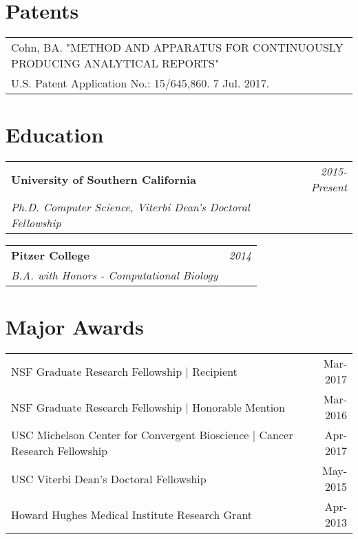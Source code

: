 \documentclass[10pt,a4paper]{article}
\begin{document}
\vspace*{3mm}\section*{Patents}

  \vspace*{1mm}\begin{tabularx}{17cm}{X}
Cohn, BA. "METHOD AND APPARATUS FOR CONTINUOUSLY PRODUCING ANALYTICAL REPORTS"\\
 U.S. Patent Application No.: 15/645,860. 7 Jul. 2017.\\[2mm]
  \end{tabularx}


  \newpage

  \vspace*{-15mm}\section*{Education}

  \vspace*{0mm}\noindent\begin{tabularx}{17cm}{X r}
    \textbf{University of Southern California} & \textit{2015-Present} \\
    \textit{Ph.D. Computer Science, Viterbi Dean's Doctoral Fellowship}
  \end{tabularx} 

  \vspace*{1mm}\noindent\begin{tabularx}{17cm}{X r}
    \textbf{Pitzer College} & \textit{2014} \\
    \textit{B.A. with Honors - Computational Biology}
  \end{tabularx}

  \vspace*{2mm}\section*{Major Awards}
  \vspace*{1mm}\noindent\begin{tabularx}{17cm}{X r}
    NSF Graduate Research Fellowship | Recipient & Mar-2017 \\
    NSF Graduate Research Fellowship | Honorable Mention & Mar-2016 \\
    USC Michelson Center for Convergent Bioscience | Cancer Research Fellowship & Apr-2017 \\ %
    USC Viterbi Dean's Doctoral Fellowship & May-2015 \\
    Howard Hughes Medical Institute Research Grant & Apr-2013
  \end{tabularx}
\end{document}
